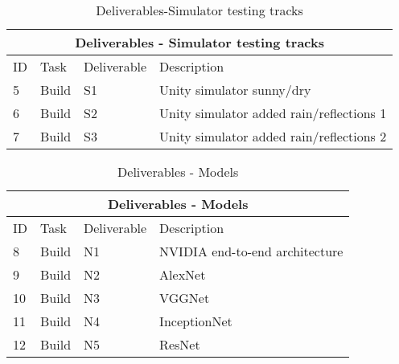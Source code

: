 \documentclass{article}
\begin{document}
\begin{table}[]
\begin{center}
\begin{tabular}{|l|l|l|l|}
\hline
\multicolumn{4}{|c|}{Deliverables - Simulator testing tracks} \\ \hline


ID & Task &  Deliverable & Description \\ \hline\hline
5 & Build & S1 &  Unity simulator sunny/dry  \\ \hline
6 & Build & S2 &  Unity simulator added rain/reflections 1 \\ \hline
7 & Build & S3 &  Unity simulator added rain/reflections 2 \\ \hline

\end{tabular}
\end{center}
\caption{Deliverables-Simulator testing tracks}
\label{Deliverables-Simulators}
\end{table}


\begin{table}[]
\begin{center}
\begin{tabular}{|l|l|l|l|}
\hline
\multicolumn{4}{|c|}{Deliverables - Models} \\ \hline


ID & Task &  Deliverable & Description \\ \hline\hline
8 & Build & N1 &  NVIDIA end-to-end architecture  \\ \hline
9 & Build & N2 &  AlexNet \\ \hline
10 & Build & N3 &  VGGNet \\ \hline
11 & Build & N4 &  InceptionNet \\ \hline
12 & Build & N5 &  ResNet \\ \hline

\end{tabular}
\end{center}
\caption{Deliverables - Models}
\label{Deliverables-Models}
\end{table}
\end{document}
